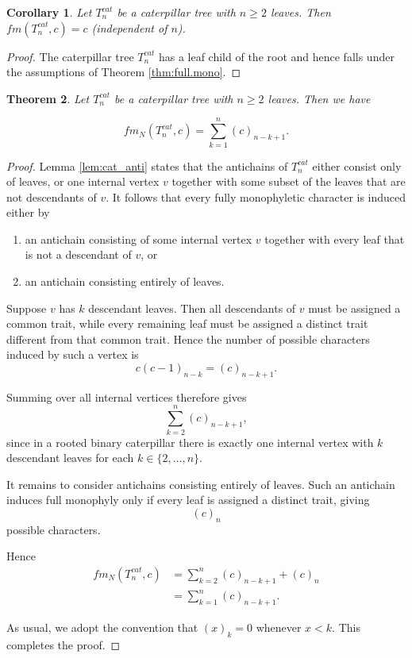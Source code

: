 \documentclass{amsart}
\newtheorem{theorem}{Theorem}
\newtheorem{corollary}[theorem]{Corollary}
\theoremstyle{definition}
\begin{document}
\begin{corollary}
    Let $T_n^{cat}$ be a caterpillar tree with $n \geq 2$ leaves. Then $fm(T_n^{cat},c)=c$ (independent of $n$). 
\end{corollary}

\begin{proof}
The caterpillar tree $T_n^{cat}$ has a leaf child of the root and hence falls under the assumptions of Theorem \ref{thm:full.mono}.
\end{proof}



\begin{theorem}
    Let $T^{cat}_n$ be a caterpillar tree with $n \ge 2$ leaves. Then we have 

    \[ fm_N(T^{cat}_n,c) = \sum_{k=1}^n (c)_{n-k+1}. 
\]
\end{theorem}

\begin{proof}
    Lemma \ref{lem:cat_anti} states that the antichains of $T_n^{cat}$ either consist only of leaves, or one internal vertex $v$ together with some subset of the leaves that are not descendants of $v$. It follows that every fully monophyletic character is induced either by
    \begin{enumerate}
        \item an antichain consisting of some internal vertex $v$ together with every leaf that is not a descendant of $v$, or
        \item an antichain consisting entirely of leaves.
    \end{enumerate}

    Suppose $v$ has $k$ descendant leaves. Then all descendants of $v$ must be assigned a common trait, while every remaining leaf must be assigned a distinct trait different from that common trait. Hence the number of possible characters induced by such a vertex is
    \[
    c(c-1)_{n-k} = (c)_{n-k+1}.
    \]

    Summing over all internal vertices therefore gives
    \[
    \sum_{k=2}^{n} (c)_{n-k+1},
    \]
    since in a rooted binary caterpillar there is exactly one internal vertex with $k$ descendant leaves for each $k\in\{2,\dots,n\}$.

    It remains to consider antichains consisting entirely of leaves. Such an antichain induces full monophyly only if every leaf is assigned a distinct trait, giving
    \[
    (c)_n
    \]
    possible characters.

    Hence 
    \begin{align*}
    fm_N(T^{cat}_n,c)
    & =
    \sum_{k=2}^{n} (c)_{n-k+1}
    +
    (c)_n \\
    &= \sum_{k=1}^n (c)_{n-k+1}.    
    \end{align*}
    
    As usual, we adopt the convention that $(x)_k=0$ whenever $x<k$. This completes the proof. 
\end{proof}
\end{document}
